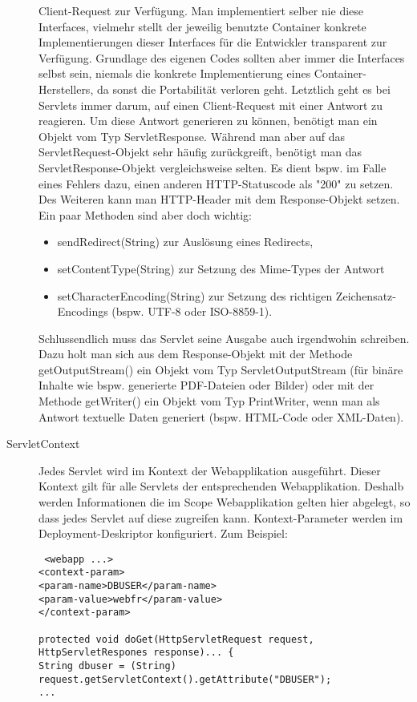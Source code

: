 \documentclass[a4paper,10pt]{scrreprt}
\begin{document}
\begin{description}
Client-Request zur Verfügung.
Man implementiert selber nie diese Interfaces, vielmehr stellt der jeweilig benutzte Container
konkrete Implementierungen dieser Interfaces für die Entwickler transparent zur Verfügung.
Grundlage des eigenen Codes sollten aber immer die Interfaces selbst sein, niemals die konkrete
Implementierung eines Container-Herstellers, da sonst die Portabilität verloren geht.
Letztlich geht es bei Servlets immer darum, auf einen Client-Request mit einer Antwort zu reagieren.
Um diese Antwort generieren zu können, benötigt man ein Objekt vom Typ ServletResponse.
Während man aber auf das ServletRequest-Objekt sehr häufig zurückgreift, benötigt man das
ServletResponse-Objekt vergleichsweise selten. Es dient bspw. im Falle eines Fehlers dazu,
einen anderen HTTP-Statuscode als "200" zu setzen. Des Weiteren kann man HTTP-Header mit
dem Response-Objekt setzen. Ein paar Methoden sind aber doch wichtig:
\begin{itemize}
\item sendRedirect(String) zur Auslösung eines Redirects,
\item setContentType(String) zur Setzung des Mime-Types der Antwort
\item  setCharacterEncoding(String) zur Setzung des richtigen Zeichensatz-Encodings
(bspw. UTF-8 oder ISO-8859-1).
\end{itemize}
Schlussendlich muss das Servlet seine Ausgabe auch irgendwohin schreiben. Dazu holt man sich
aus dem Response-Objekt mit der Methode getOutputStream() ein Objekt vom Typ
ServletOutputStream (für binäre Inhalte wie bspw. generierte PDF-Dateien oder Bilder) oder mit
der Methode getWriter() ein Objekt vom Typ PrintWriter, wenn man als Antwort textuelle
Daten generiert (bspw. HTML-Code oder XML-Daten).
\item[ServletContext] Jedes Servlet wird im Kontext der Webapplikation ausgeführt. Dieser Kontext gilt für alle Servlets
der entsprechenden Webapplikation. Deshalb werden Informationen die im Scope Webapplikation
gelten hier abgelegt, so dass jedes Servlet auf diese zugreifen kann.
Kontext-Parameter werden im Deployment-Deskriptor konfiguriert. Zum Beispiel:
\begin{verbatim}
 <webapp ...>
<context-param>
<param-name>DBUSER</param-name>
<param-value>webfr</param-value>
</context-param>

protected void doGet(HttpServletRequest request, HttpServletRespones response)... {
String dbuser = (String) request.getServletContext().getAttribute("DBUSER");
...
\end{verbatim}


\end{description}
\end{document}
